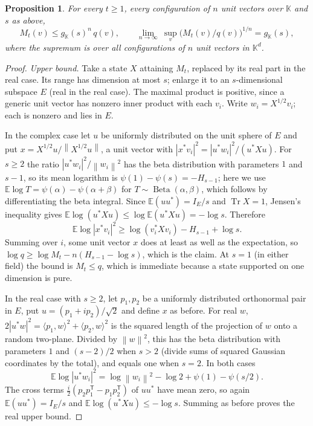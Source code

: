 \documentclass[11pt,a4paper]{article}
\newtheorem{proposition}[theorem]{Proposition}
\theoremstyle{remark}
\newcommand{\tr}{\operatorname{Tr}}
\newcommand{\norm}[1]{\left\lVert#1\right\rVert}
\newcommand{\K}{\mathbb K}
\begin{document}
\begin{proposition}\label{prop:gap}
For every $t\ge1$, every configuration of $n$ unit vectors over $\K$ and $s$ as above,
\[
 M_t(v)\le g_{\K}(s)^n\,q(v),\qquad
 \lim_{n\to\infty}\ \sup_v\big(M_t(v)/q(v)\big)^{1/n}=g_{\K}(s),
\]
where the supremum is over all configurations of $n$ unit vectors in $\K^d$.
\end{proposition}
\begin{proof}
\emph{Upper bound.} Take a state $X$ attaining $M_t$, replaced by its real part in the real case. Its range has dimension at most $s$; enlarge it to an $s$-dimensional subspace $E$ (real in the real case). The maximal product is positive, since a generic unit vector has nonzero inner product with each $v_i$. Write $w_i=X^{1/2}v_i$; each is nonzero and lies in $E$.

In the complex case let $u$ be uniformly distributed on the unit sphere of $E$ and put $x=X^{1/2}u/\norm{X^{1/2}u}$, a unit vector with $|x^*v_i|^2=|u^*w_i|^2/(u^*Xu)$. For $s\ge2$ the ratio $|u^*w_i|^2/\norm{w_i}^2$ has the beta distribution with parameters $1$ and $s-1$, so its mean logarithm is $\psi(1)-\psi(s)=-H_{s-1}$; here we use $\mathbb E\log T=\psi(\alpha)-\psi(\alpha+\beta)$ for $T\sim\operatorname{Beta}(\alpha,\beta)$, which follows by differentiating the beta integral. Since $\mathbb E(uu^*)=I_E/s$ and $\tr X=1$, Jensen's inequality gives $\mathbb E\log(u^*Xu)\le\log\mathbb E(u^*Xu)=-\log s$. Therefore
\[
 \mathbb E\log|x^*v_i|^2\ge \log(v_i^*Xv_i)-H_{s-1}+\log s .
\]
Summing over $i$, some unit vector $x$ does at least as well as the expectation, so $\log q\ge\log M_t-n(H_{s-1}-\log s)$, which is the claim. At $s=1$ (in either field) the bound is $M_t\le q$, which is immediate because a state supported on one dimension is pure.

In the real case with $s\ge2$, let $p_1,p_2$ be a uniformly distributed orthonormal pair in $E$, put $u=(p_1+ip_2)/\sqrt2$ and define $x$ as before. For real $w$, $2|u^*w|^2=\langle p_1,w\rangle^2+\langle p_2,w\rangle^2$ is the squared length of the projection of $w$ onto a random two-plane. Divided by $\norm w^2$, this has the beta distribution with parameters $1$ and $(s-2)/2$ when $s>2$ (divide sums of squared Gaussian coordinates by the total), and equals one when $s=2$. In both cases
\[
 \mathbb E\log|u^*w_i|^2=\log\norm{w_i}^2-\log2+\psi(1)-\psi(s/2).
\]
The cross terms $\tfrac i2(p_2p_1^{\mathsf T}-p_1p_2^{\mathsf T})$ of $uu^*$ have mean zero, so again $\mathbb E(uu^*)=I_E/s$ and $\mathbb E\log(u^*Xu)\le-\log s$. Summing as before proves the real upper bound.


\end{proof}
\end{document}
